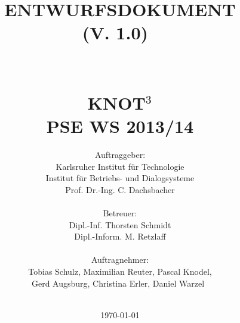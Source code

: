\documentclass{scrreprt}
\begin{document}
\title{\textbf{\Huge{ENTWURFSDOKUMENT}}\\\Large{(V. 1.0)}~\\~\\~\\
		\textbf{\Large{KNOT$^3$}}\\
		PSE WS 2013/14}
\author{\Large{Auftraggeber:}\\
        \Large{Karlsruher Institut für Technologie}\\
        \Large{Institut für Betriebs- und Dialogsysteme}\\
        \Large{Prof. Dr.-Ing. C. Dachsbacher}\\~\\
        \Large{Betreuer:}\\
        \Large{Dipl.-Inf. Thorsten Schmidt}\\
        \Large{Dipl.-Inform. M. Retzlaff}\\~\\
        \Large{Auftragnehmer:}\\
        \Large{Tobias Schulz, Maximilian Reuter, Pascal                    Knodel,}\\
	 	\Large{Gerd Augsburg, Christina Erler, Daniel Warzel}~\\~\\}
\date{\today}

\maketitle

\tableofcontents







\appendix



\end{document}
